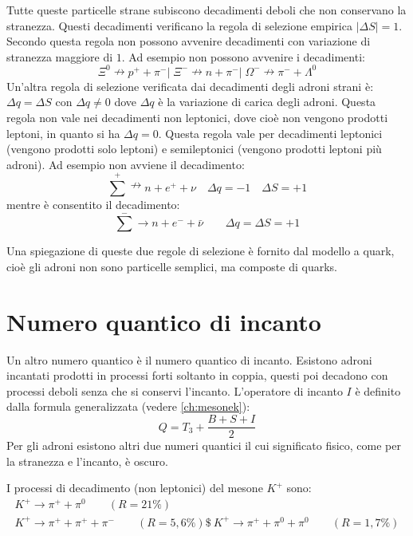 Tutte queste particelle strane subiscono decadimenti deboli che non conservano 
la stranezza.
Questi decadimenti verificano la regola di selezione empirica $|\Delta S|=1$. 
Secondo questa regola non
possono avvenire decadimenti con variazione di stranezza maggiore di $1$.
Ad esempio non possono avvenire i decadimenti:
\begin{equation}
\Xi^0\nrightarrow p^++\pi^-|\;\Xi^-\nrightarrow n+\pi^-|\;\Omega^-\nrightarrow 
\pi^-+\Lambda^0
\end{equation}
Un'altra regola di selezione verificata dai decadimenti degli adroni strani è:
$\Delta q= \Delta S$ con $\Delta q\neq 0$ dove $\Delta q$ è la variazione di 
carica
degli adroni. Questa regola non vale nei decadimenti non leptonici, dove cioè 
non vengono prodotti leptoni, in
quanto si ha $\Delta q=0$. Questa regola vale per decadimenti leptonici 
(vengono prodotti solo leptoni) e
semileptonici (vengono prodotti leptoni più adroni). Ad esempio non avviene il 
decadimento:
\begin{equation}
\sum^+ \nrightarrow n+e^+ +\nu\quad \Delta q=-1\quad \Delta S=+1
\end{equation}
mentre è consentito il decadimento:
\begin{equation}
\sum^-\rightarrow n+e^-+\bar{\nu}\qquad \Delta q=\Delta S=+1
\end{equation}

Una spiegazione di queste due regole di selezione è fornito dal modello a 
quark, cioè gli adroni non sono
particelle semplici, ma composte di quarks.

\section{Numero quantico di incanto}
Un altro numero quantico è il numero quantico di incanto.
Esistono adroni incantati prodotti in processi forti soltanto in coppia,
questi poi decadono con processi deboli senza che si conservi l'incanto.
L'operatore di incanto $I$ è definito dalla formula generalizzata (vedere
\autoref{ch:mesonek}):
\begin{equation}
Q=T_3+\frac{B+S+I}{2}
\end{equation}
Per gli adroni esistono altri due numeri quantici il cui significato fisico, 
come per la stranezza e l'incanto, è oscuro.

 I processi di decadimento (non leptonici) del mesone 
$K^+$ sono:
\begin{gather}
K^+\rightarrow \pi^++\pi^0\qquad (R=21\%)\\
K^+\rightarrow \pi^++\pi^++\pi^-\qquad(R=5,6\%)\$\
K^+\rightarrow \pi^++\pi^0+\pi^0\qquad (R=1,7\%)
\end{gather}


